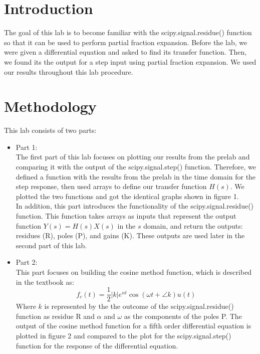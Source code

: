 \documentclass[12pt]{report}
\begin{document}
\section{Introduction}
The goal of this lab is to become familiar with the scipy.signal.residue() function so that it can be used to perform partial fraction expansion. Before the lab, we were given a differential equation and asked to find its transfer function. Then, we found its the output for a step input using partial fraction expansion. We used our results throughout this lab procedure.

\section{Methodology}

This lab consists of two parts:
\begin{itemize}
    \item
    Part 1:\\
    The first part of this lab focuses on plotting our results from the prelab and comparing it with the output of the scipy.signal.step() function. Therefore, we defined a function with the results from the prelab in the time domain for the step response, then used arrays to define our transfer function $H(s)$. We plotted the two functions and got the identical graphs shown in figure 1.\\ 
    In addition, this part introduces the functionality of the scipy.signal.residue() function. This function takes arrays as inputs that represent the output function $Y(s)=H(s)X(s)$ in the $s$ domain, and return the outputs: residues (R), poles (P), and gains (K). These outputs are used later in the second part of this lab.

    \item
    Part 2:\\
    This part focuses on building the cosine method function, which is described in the textbook as:
    $$f_c(t)=\frac{1}{2}|k| e^{\alpha t}\cos(\omega t + \angle k)u(t)$$
    Where $k$ is represented by the the outcome of the scipy.signal.residue() function as residue R and $\alpha$ and $\omega$ as the components of the poles P. The output of the cosine method function for a fifth order differential equation is plotted in figure 2 and compared to the plot for the scipy.signal.step() function for the response of the differential equation. 

\end{itemize}
   
\end{document}

